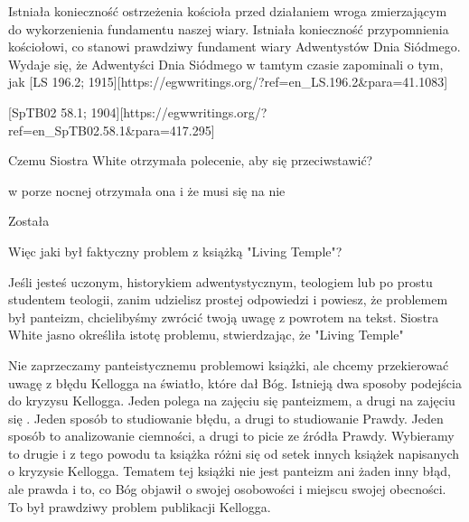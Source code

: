 Istniała konieczność ostrzeżenia kościoła przed działaniem wroga zmierzającym do wykorzenienia fundamentu naszej wiary. Istniała konieczność przypomnienia kościołowi, co stanowi prawdziwy fundament wiary Adwentystów Dnia Siódmego. Wydaje się, że Adwentyści Dnia Siódmego w tamtym czasie zapominali o tym, jak [LS 196.2; 1915][https://egwwritings.org/?ref=en\_LS.196.2&para=41.1083]


[SpTB02 58.1; 1904][https://egwwritings.org/?ref=en\_SpTB02.58.1&para=417.295]


Czemu Siostra White otrzymała polecenie, aby się przeciwstawić?


 w porze nocnej  otrzymała ona i że musi się na nie  

Została 


Więc jaki był faktyczny problem z książką "Living Temple"?


Jeśli jesteś uczonym, historykiem adwentystycznym, teologiem lub po prostu studentem teologii, zanim udzielisz prostej odpowiedzi i powiesz, że problemem był panteizm, chcielibyśmy zwrócić twoją uwagę z powrotem na tekst. Siostra White jasno określiła istotę problemu, stwierdzając, że "Living Temple" 


Nie zaprzeczamy panteistycznemu problemowi książki, ale chcemy przekierować uwagę z błędu Kellogga na światło, które dał Bóg. Istnieją dwa sposoby podejścia do kryzysu Kellogga. Jeden polega na zajęciu się panteizmem, a drugi na zajęciu się . Jeden sposób to studiowanie błędu, a drugi to studiowanie Prawdy. Jeden sposób to analizowanie ciemności, a drugi to picie ze źródła Prawdy. Wybieramy to drugie i z tego powodu ta książka różni się od setek innych książek napisanych o kryzysie Kellogga. Tematem tej książki nie jest panteizm ani żaden inny błąd, ale prawda i to, co Bóg objawił o swojej osobowości i miejscu swojej obecności. To był prawdziwy problem publikacji Kellogga.

